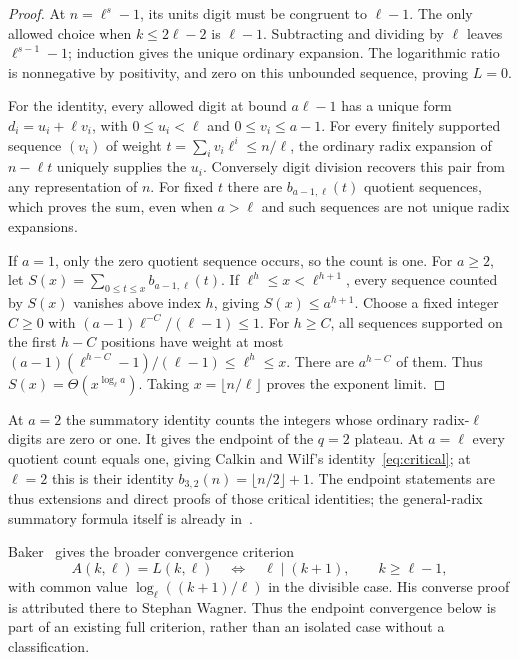 \documentclass[11pt]{article}
\begin{document}
\begin{proof}
At $n=\ell^s-1$, its units digit must be congruent to $\ell-1$.
The only allowed choice when $k\le2\ell-2$ is $\ell-1$.
Subtracting and dividing by $\ell$ leaves $\ell^{s-1}-1$;
induction gives the unique ordinary expansion.
The logarithmic ratio is nonnegative by positivity, and zero on
this unbounded sequence, proving $L=0$.

For the identity, every allowed digit at bound $a\ell-1$ has a
unique form $d_i=u_i+\ell v_i$, with $0\le u_i<\ell$ and
$0\le v_i\le a-1$.
For every finitely supported sequence $(v_i)$ of weight
$t=\sum_i v_i\ell^i\le n/\ell$, the ordinary radix expansion of
$n-\ell t$ uniquely supplies the $u_i$. Conversely digit division
recovers this pair from any representation of $n$.
For fixed $t$ there are $b_{a-1,\ell}(t)$ quotient sequences,
which proves the sum, even when $a>\ell$ and such sequences are
not unique radix expansions.

If $a=1$, only the zero quotient sequence occurs, so the count is
one. For $a\ge2$, let
$S(x)=\sum_{0\le t\le x}b_{a-1,\ell}(t)$.
If $\ell^h\le x<\ell^{h+1}$, every sequence counted by $S(x)$
vanishes above index $h$, giving $S(x)\le a^{h+1}$.
Choose a fixed integer $C\ge0$ with
$(a-1)\ell^{-C}/(\ell-1)\le1$.
For $h\ge C$, all sequences supported on the first $h-C$ positions
have weight at most
$(a-1)(\ell^{h-C}-1)/(\ell-1)\le\ell^h\le x$.
There are $a^{h-C}$ of them. Thus
$S(x)=\Theta(x^{\log_\ell a})$.
Taking $x=\lfloor n/\ell\rfloor$ proves the exponent limit.
\end{proof}

At $a=2$ the summatory identity counts the integers whose ordinary
radix-$\ell$ digits are zero or one. It gives the endpoint of the
$q=2$ plateau. At $a=\ell$ every quotient count equals one, giving
Calkin and Wilf's identity~\eqref{eq:critical}; at $\ell=2$ this is
their identity $b_{3,2}(n)=\lfloor n/2\rfloor+1$.
The endpoint statements are thus extensions and direct proofs of
those critical identities; the general-radix summatory formula itself
is already in~\cite{DST}.

Baker~\cite[Proposition~2.3 and Theorem~2.5, pp.~26, 28--29]{Baker}
gives the broader convergence criterion
\[
 A(k,\ell)=L(k,\ell)\quad\Longleftrightarrow\quad\ell\mid(k+1),
 \qquad k\ge\ell-1,
\]
with common value $\log_\ell((k+1)/\ell)$ in the divisible case.
His converse proof is attributed there to Stephan Wagner.
Thus the endpoint convergence below is part of an existing full
criterion, rather than an isolated case without a classification.
\end{document}
